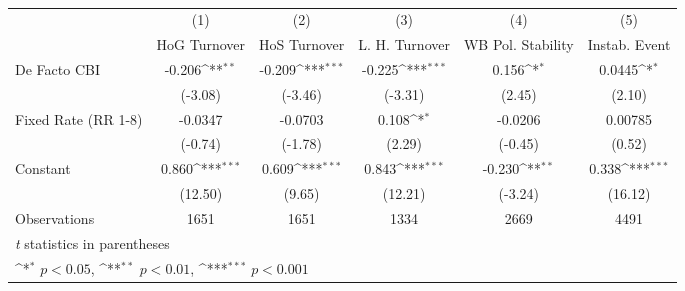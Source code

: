 \begin{table}[htbp]\centering
\def\sym#1{\ifmmode^{#1}\else\(^{#1}\)\fi}
\caption{\label{binaryIndOLSDF}}
\begin{tabular}{l*{5}{c}}
\toprule
                                        &\multicolumn{1}{c}{(1)}&\multicolumn{1}{c}{(2)}&\multicolumn{1}{c}{(3)}&\multicolumn{1}{c}{(4)}&\multicolumn{1}{c}{(5)}\\
                                        &\multicolumn{1}{c}{HoG Turnover}&\multicolumn{1}{c}{HoS Turnover}&\multicolumn{1}{c}{L. H. Turnover}&\multicolumn{1}{c}{WB Pol. Stability}&\multicolumn{1}{c}{Instab. Event}\\
\midrule
De Facto CBI                            &   -0.206\sym{**} &   -0.209\sym{***}&   -0.225\sym{***}&    0.156\sym{*}  &   0.0445\sym{*}  \\
                                        &  (-3.08)         &  (-3.46)         &  (-3.31)         &   (2.45)         &   (2.10)         \\
\addlinespace
Fixed Rate (RR 1-8)                     &  -0.0347         &  -0.0703         &    0.108\sym{*}  &  -0.0206         &  0.00785         \\
                                        &  (-0.74)         &  (-1.78)         &   (2.29)         &  (-0.45)         &   (0.52)         \\
\addlinespace
Constant                                &    0.860\sym{***}&    0.609\sym{***}&    0.843\sym{***}&   -0.230\sym{**} &    0.338\sym{***}\\
                                        &  (12.50)         &   (9.65)         &  (12.21)         &  (-3.24)         &  (16.12)         \\
\midrule
Observations                            &     1651         &     1651         &     1334         &     2669         &     4491         \\
\bottomrule
\multicolumn{6}{l}{\footnotesize \textit{t} statistics in parentheses}\\
\multicolumn{6}{l}{\footnotesize \sym{*} \(p<0.05\), \sym{**} \(p<0.01\), \sym{***} \(p<0.001\)}\\
\end{tabular}
\end{table}
